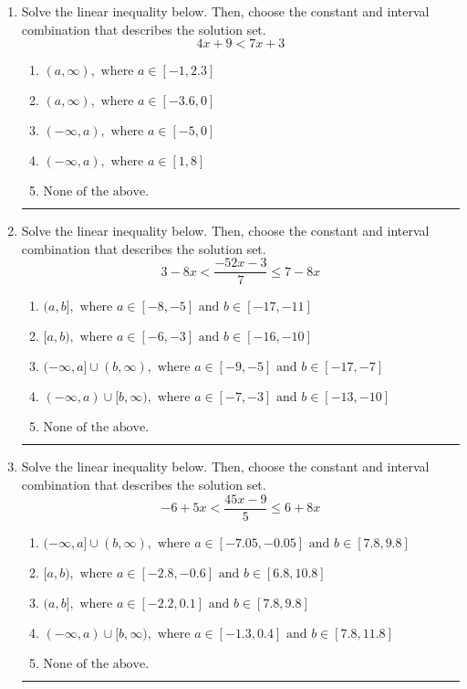\documentclass[14pt]{extbook}
\newcommand{\litem}[1]{\item#1\hspace*{-1cm}\rule{\textwidth}{0.4pt}}
\begin{document}
\begin{enumerate}
{\begin{enumerate}[label=\Alph*.]
\end{enumerate} }
\litem{
Solve the linear inequality below. Then, choose the constant and interval combination that describes the solution set.\[ 4x + 9 < 7x + 3 \]\begin{enumerate}[label=\Alph*.]
\item \( (a, \infty), \text{ where } a \in [-1, 2.3] \)
\item \( (a, \infty), \text{ where } a \in [-3.6, 0] \)
\item \( (-\infty, a), \text{ where } a \in [-5, 0] \)
\item \( (-\infty, a), \text{ where } a \in [1, 8] \)
\item \( \text{None of the above}. \)

\end{enumerate} }
\litem{
Solve the linear inequality below. Then, choose the constant and interval combination that describes the solution set.\[ 3 - 8 x < \frac{-52 x - 3}{7} \leq 7 - 8 x \]\begin{enumerate}[label=\Alph*.]
\item \( (a, b], \text{ where } a \in [-8, -5] \text{ and } b \in [-17, -11] \)
\item \( [a, b), \text{ where } a \in [-6, -3] \text{ and } b \in [-16, -10] \)
\item \( (-\infty, a] \cup (b, \infty), \text{ where } a \in [-9, -5] \text{ and } b \in [-17, -7] \)
\item \( (-\infty, a) \cup [b, \infty), \text{ where } a \in [-7, -3] \text{ and } b \in [-13, -10] \)
\item \( \text{None of the above.} \)

\end{enumerate} }
\litem{
Solve the linear inequality below. Then, choose the constant and interval combination that describes the solution set.\[ -6 + 5 x < \frac{45 x - 9}{5} \leq 6 + 8 x \]\begin{enumerate}[label=\Alph*.]
\item \( (-\infty, a] \cup (b, \infty), \text{ where } a \in [-7.05, -0.05] \text{ and } b \in [7.8, 9.8] \)
\item \( [a, b), \text{ where } a \in [-2.8, -0.6] \text{ and } b \in [6.8, 10.8] \)
\item \( (a, b], \text{ where } a \in [-2.2, 0.1] \text{ and } b \in [7.8, 9.8] \)
\item \( (-\infty, a) \cup [b, \infty), \text{ where } a \in [-1.3, 0.4] \text{ and } b \in [7.8, 11.8] \)
\item \( \text{None of the above.} \)

\end{enumerate} }
\end{enumerate}
\end{document}
